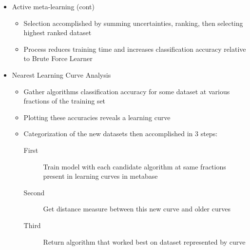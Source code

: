 \documentclass{beamer}
\begin{document}
\begin{frame}[t]
  \begin{itemize}
    \item Active meta-learning (cont)
    \begin{itemize}
       \item Selection accomplished by summing uncertainties, ranking, then
             selecting highest ranked dataset
       \item Process reduces training time and increases classification
             accuracy relative to Brute Force Learner
    \end{itemize}
  \end{itemize}

  \begin{itemize}
  \item Nearest Learning Curve Analysis
    \begin{itemize}
       \item Gather algorithms classification accuracy for some dataset at
             various fractions of the training set
       \item Plotting these accuracies reveals a learning curve
       \item Categorization of the new datasets then accomplished in 3 steps:
          \begin{description}
               \item[First]  Train model with each candidate algorithm at same
                             fractions present in learning curves in metabase
               \item[Second] Get distance measure between this new curve and
                             older curves
               \item[Third]  Return algorithm that worked best on dataset
                             represented by curve
          \end{description}
    \end{itemize}
   \end{itemize}
\end{frame}
\end{document}

